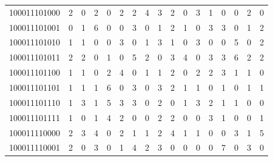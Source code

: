 \documentclass[10pt,a4paper]{article}
\begin{document}
\begin{longtable}{ |c|c|c|c|c|c|c|c|c|c|c|c|c|c|c|c|c| }
    100011101000              & 2                            & 0                                & 2                            & 0                              & 2   & 2   & 4   & 3   & 2   & 0   & 3   & 1   & 0   & 0   & 2   & 0   \\
    100011101001              & 0                            & 1                                & 6                            & 0                              & 0   & 3   & 0   & 1   & 2   & 1   & 0   & 3   & 3   & 0   & 1   & 2   \\
    100011101010              & 1                            & 1                                & 0                            & 0                              & 3   & 0   & 1   & 3   & 1   & 0   & 3   & 0   & 0   & 5   & 0   & 2   \\
    100011101011              & 2                            & 2                                & 0                            & 1                              & 0   & 5   & 2   & 0   & 3   & 4   & 0   & 3   & 3   & 6   & 2   & 2   \\
    100011101100              & 1                            & 1                                & 0                            & 2                              & 4   & 0   & 1   & 1   & 2   & 0   & 2   & 2   & 3   & 1   & 1   & 0   \\
    100011101101              & 1                            & 1                                & 1                            & 6                              & 0   & 3   & 0   & 3   & 2   & 1   & 1   & 0   & 1   & 0   & 1   & 1   \\
    100011101110              & 1                            & 3                                & 1                            & 5                              & 3   & 3   & 0   & 2   & 0   & 1   & 3   & 2   & 1   & 1   & 0   & 0   \\
    100011101111              & 1                            & 0                                & 1                            & 4                              & 2   & 0   & 0   & 2   & 2   & 0   & 0   & 3   & 1   & 0   & 0   & 1   \\
    100011110000              & 2                            & 3                                & 4                            & 0                              & 2   & 1   & 1   & 2   & 4   & 1   & 1   & 0   & 0   & 3   & 1   & 5   \\
    100011110001              & 2                            & 0                                & 3                            & 0                              & 1   & 4   & 2   & 3   & 0   & 0   & 0   & 0   & 7   & 0   & 3   & 0   \\

\end{longtable}
\end{document}
